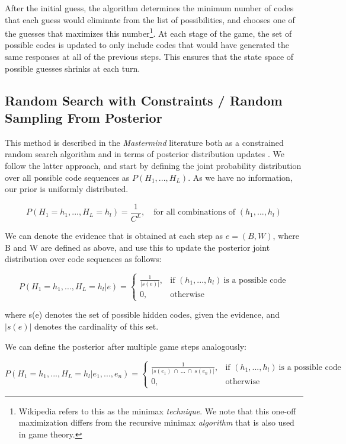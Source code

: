 \documentclass[11pt]{article}
\begin{document}
After the initial guess, the algorithm determines the minimum number of codes that each guess would eliminate from the list of possibilities, and chooses one of the guesses that maximizes this number\footnote{Wikipedia refers to this as the minimax \textit{technique}. We note that this one-off maximization differs from the recursive minimax \textit{algorithm} that is also used in game theory.}. At each stage of the game, the set of possible codes is updated to only include codes that would have generated the same responses at all of the previous steps. This ensures that the state space of possible guesses shrinks at each turn.

\subsection{Random Search with Constraints / Random Sampling From Posterior}

This method is described in the \textit{Mastermind} literature both as a constrained random search algorithm \cite{bernier1996solving} and in terms of posterior distribution updates \cite{vomlel2004bayesian}. We follow the latter approach, and start by defining the joint probability distribution over all possible code sequences as $P(H_1, ..., H_L)$. As we have no information, our prior is uniformly distributed.

\[
P(H_1=h_1, ..., H_L=h_l) = \frac{1}{C^L} ,\quad \text{for all combinations of }(h_1, ..., h_l)
\]

\noindent We can denote the evidence that is obtained at each step as $e = (B, W)$, where B and W are defined as above, and use this to update the posterior joint distribution over code sequences as follows:

\[
    P(H_1=h_1, ..., H_L=h_l | e) = 
\begin{cases}
    \frac{1}{|s(e)|},& \text{if } (h_1, ..., h_l) \ \text{is a possible code}\\
    0,              & \text{otherwise}
\end{cases}
\]

\noindent where s(e) denotes the set of possible hidden codes, given the evidence, and $|s(e)|$ denotes the cardinality of this set. \medskip

\noindent We can define the posterior after multiple game steps analogously:

\[
    P(H_1=h_1, ..., H_L=h_l | e_1, ..., e_n) = 
\begin{cases}
    \frac{1}{| s(e_1) \ \cap \ ... \ \cap \ s(e_n) |},& \text{if } (h_1, ..., h_l) \ \text{is a possible code}\\
    0,              & \text{otherwise}
\end{cases}
\]
\end{document}
